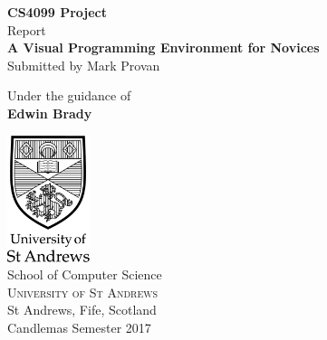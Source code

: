 \begin{titlepage}

\begin{center}

\textup{\small {\bf CS4099 Project} \\ Report}\\[0.2in]

\Large \textbf {A Visual Programming Environment for Novices}\\[0.5in]

\normalsize Submitted by Mark Provan

\vspace{.1in}
Under the guidance of\\
{\textbf{Edwin Brady}}\\[0.2in]

\vfill

\includegraphics[width=0.18\textwidth]{sta-logo}\\[0.1in]
\Large{School of Computer Science}\\
\normalsize
\textsc{University of St Andrews}\\
St Andrews, Fife, Scotland \\
\vspace{0.2cm}
Candlemas Semester 2017

\end{center}

\end{titlepage}
